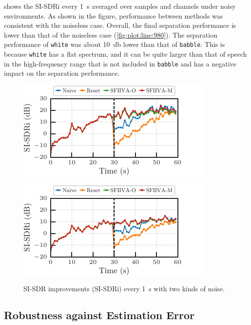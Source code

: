 \documentclass[sip,biber]{now-journal}
\begin{document}
 shows the SI-SDRi every \SI{1}{\second} averaged over samples and channels under noisy environments.
As shown in the figure, performance between methods was consistent with the noiseless case.
Overall, the final separation performance is lower than that of the noiseless case (\cref{fig:plot:line:980}).
The separation performance of \texttt{white} was about \SI{10}{\decibel} lower than that of \texttt{babble}.
This is because \texttt{white} has a flat spectrum, and it can be quite larger than that of speech in the high-frequency range that is not included in \texttt{babble} and has a negative impact on the separation performance.
\begin{figure}[t]
  \centering
  \begin{minipage}[t]{.45\textwidth}
    \centering\includegraphics{figures/plots/babble-norm/line_980.pdf}\label{fig:plot:line:980:babble}
  \end{minipage}
  \hspace{.05\textwidth}
  \begin{minipage}[t]{.45\textwidth}
    \centering\includegraphics{figures/plots/white-norm/line_980.pdf}\label{fig:plot:line:980:white}
  \end{minipage}
  \caption{SI-SDR improvements (SI-SDRi) every \SI{1}{\second} with two kinds of noise.}%
  \label{fig:plot:line:noise}
\end{figure}

\subsection{Robustness against Estimation Error}
\end{document}

